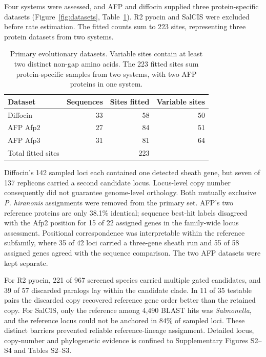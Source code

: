 \documentclass[11pt,a4paper]{article}
\begin{document}
Four systems were assessed, and AFP and diffocin supplied three protein-specific datasets (Figure~\ref{fig:datasets}, Table~\ref{tab:datasets}). R2 pyocin and SalCIS were excluded before rate estimation. The fitted counts sum to 223 sites, representing three protein datasets from two systems.

\begin{table}[htbp]
\centering
\caption{Primary evolutionary datasets. Variable sites contain at least two distinct non-gap amino acids. The 223 fitted sites sum protein-specific samples from two systems, with two AFP proteins in one system.}
\label{tab:datasets}
\footnotesize
\setlength{\tabcolsep}{3pt}
\renewcommand{\arraystretch}{1.25}
\begin{tabularx}{\textwidth}{@{}>{\raggedright\arraybackslash}Xrrr@{}}
\toprule
\textbf{Dataset} & \textbf{Sequences} & \textbf{Sites fitted} & \textbf{Variable sites} \\
\midrule
Diffocin & 33 & 58 & 50 \\
AFP Afp2 & 27 & 84 & 51 \\
AFP Afp3 & 31 & 81 & 64 \\
Total fitted sites &  & 223 &  \\
\bottomrule
\end{tabularx}
\end{table}

Diffocin's 142 sampled loci each contained one detected sheath gene, but seven of 137 replicons carried a second candidate locus. Locus-level copy number consequently did not guarantee genome-level orthology. Both mutually exclusive \emph{P. hiranonis} assignments were removed from the primary set. AFP's two reference proteins are only 38.1\% identical; sequence best-hit labels disagreed with the Afp2 position for 15 of 22 assigned genes in the family-wide locus assessment. Positional correspondence was interpretable within the reference subfamily, where 35 of 42 loci carried a three-gene sheath run and 55 of 58 assigned genes agreed with the sequence comparison. The two AFP datasets were kept separate.

For R2 pyocin, 221 of 967 screened species carried multiple gated candidates, and 39 of 57 discarded paralogs lay within the candidate clade. In 11 of 35 testable pairs the discarded copy recovered reference gene order better than the retained copy. For SalCIS, only the reference among 4,490 BLAST hits was \emph{Salmonella}, and the reference locus could not be anchored in 84\% of sampled loci. These distinct barriers prevented reliable reference-lineage assignment. Detailed locus, copy-number and phylogenetic evidence is confined to Supplementary Figures S2--S4 and Tables S2--S3.
\end{document}
